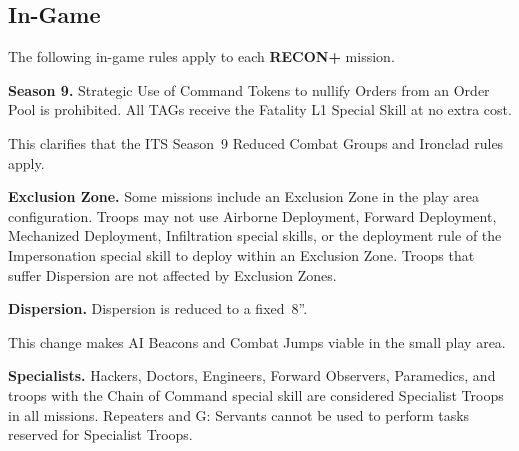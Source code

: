 \documentclass[14pt,dvipsnames]{extarticle}
\newcommand{\missionrule}[1]{\noindent\textbf{#1}\xspace}
\newcommand{\reconplus}{\textbf{RECON+}\xspace}
\begin{document}
\vspace{-7pt}
\subsection{In-Game}

The following in-game rules apply to each \reconplus mission.

\vspace{-7pt}
\missionrule{Season 9.} Strategic Use of Command Tokens to nullify
Orders from an Order Pool is prohibited.  All TAGs receive the
Fatality L1 Special Skill at no extra cost.



\vspace{-7pt}
\begin{recon}
  This clarifies that the ITS Season~9 Reduced Combat Groups and
  Ironclad rules apply.
  
\end{recon}

\vspace{-7pt}
\missionrule{Exclusion Zone.}  Some missions include an Exclusion Zone
in the play area configuration.  Troops may not use Airborne
Deployment, Forward Deployment, Mechanized Deployment, Infiltration
special skills, or the deployment rule of the Impersonation special
skill to deploy within an Exclusion Zone.  Troops that suffer
Dispersion are not affected by Exclusion Zones.

\vspace{-7pt}
\missionrule{Dispersion.} Dispersion is reduced to a fixed~8''.

\vspace{-7pt}
\begin{recon}
  This change makes AI Beacons and Combat Jumps viable in the small
  play area.
\end{recon}

\vspace{-7pt}
\missionrule{Specialists.}  Hackers, Doctors, Engineers, Forward
Observers, Paramedics, and troops with the Chain of Command special
skill are considered Specialist Troops in all missions.  Repeaters and
G: Servants cannot be used to perform tasks reserved for Specialist
Troops.
\end{document}
